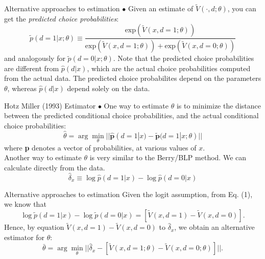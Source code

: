 \begin{frame}{Alternative approaches to estimation}
$\bullet$ Given an estimate of $\tilde V (\cdot, d; \theta)$, you can get the \emph{predicted choice probabilities}: 
\begin{equation}
\tilde p (d =1 |x ; \theta) \equiv \frac {\text{exp} \left ( \tilde V (x, d=1; \theta) \right )}{\text{exp} \left ( \tilde V (x, d=1 ;\theta) \right ) + \text{exp} \left ( \tilde V (x, d= 0 ;\theta ) \right )}
\end{equation}
and analogously for $\tilde p (d = 0 |x ; \theta)$. Note that the predicted choice probabilities are different from $\hat p (d|x)$, which are the actual choice probabilities computed from the actual data. The predicted choice probabilites depend on the parameters $\theta$, whereas $\hat p (d|x)$ depend solely on the data. 
\end{frame}

\begin{frame}{Hotz Miller (1993) Estimator}
$\bullet$ One way to estimate $\theta$ is to minimize the distance between the predicted conditional choice probabilities, and the actual conditional choice probabilities:
\begin{equation*}
\hat \theta = \arg \min_\theta || \hat {\mathbf{p}} (d = 1 |x) - \tilde {\mathbf{p}} (d = 1 |x; \theta) ||
\end{equation*}
where \textbf{p} denotes a vector of probabilities, at various values of $x$. \\
Another way to estimate $\theta$ is very similar to the Berry/BLP method. We can calculate directly from the data. 
\begin{equation*}
\hat \delta_x \equiv \log \hat p ( d =1 |x) - \log \hat p (d = 0 |x)
\end{equation*}
\end{frame}

\begin{frame}{Alternative approaches to estimation}
Given the logit assumption, from Eq. (1), we know that
\begin{equation*}
\log \tilde p (d=1 |x) - \log \tilde p (d =0 |x) = \left [ \tilde V (x, d =1 ) - \tilde V (x, d = 0) \right ] .
\end{equation*}
Hence, by equation $\tilde V (x, d = 1) - \tilde V (x, d =0)$ to $\hat \delta_x$, we obtain an alternative estimator for $\theta$:
\begin{equation*}
\bar \theta = \arg \min_\theta || \hat \delta_x - \left [ \tilde V (x, d =1; \theta) - \tilde V (x, d = 0 ;\theta) \right ] ||.
\end{equation*}
\end{frame}

